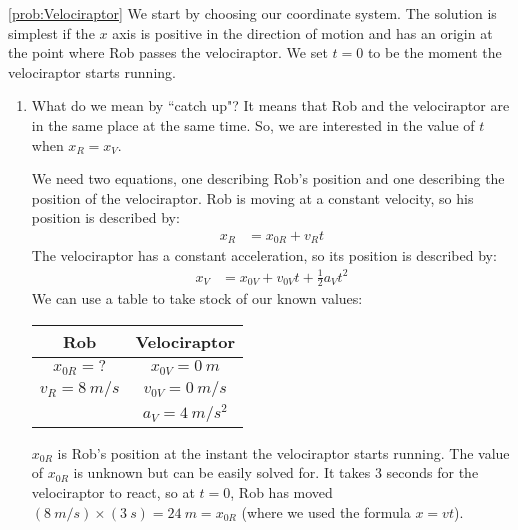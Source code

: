 \newpage
\begin{solution}{\ref{prob:Velociraptor}}
We start by choosing our coordinate system. The solution is simplest if the $x$ axis is positive in the direction of motion and has an origin at the point where Rob passes the velociraptor. We set $t=0$ to be the moment the velociraptor starts running.\\


\begin{enumerate}[label=(\alph*)]
\item What do we mean by ``catch up"? It means that Rob and the velociraptor are in the same place at the same time. So, we are interested in the value of $t$ when $x_R=x_V$. 

We need two equations, one describing Rob's position and one describing the position of the velociraptor. Rob is moving at a constant velocity, so his position is described by:
\begin{align*}
x_R&=x_{0R}+v_{R}t
\end{align*}
The velociraptor has a constant acceleration, so its position is described by:
\begin{align*}
x_V&=x_{0V}+v_{0V}t+\frac{1}{2}a_Vt^2
\end{align*}
We can use a table to take stock of our known values:
\begin{table}[H]
\centering
\label{KnownsUnknownsSampleProb1D}
\begin{tabular}{|c|c|}
\hline
\textbf{Rob}          & \textbf{Velociraptor}  \\ \hline
$x_{0R} = ?$          & $x_{0V} = \SI{0}{m}$   \\
$v_R = \SI{8}{m/s}$   & $v_{0V} = \SI{0}{m/s}$ \\
                   & $a_V = \SI{4}{m/s^2}$  \\                                     
\end{tabular}
\end{table}

$x_{0R}$ is Rob's position at the instant the velociraptor starts running. The value of $x_{0R}$ is unknown but can be easily solved for. It takes 3 seconds for the velociraptor to react, so at $t=0$, Rob has moved $(\SI{8}{m/s})\times (\SI{3}{s}) = \SI{24}{m} = x_{0R}$ (where we used the formula $x=vt$).\\


\end{enumerate}
\end{solution}

